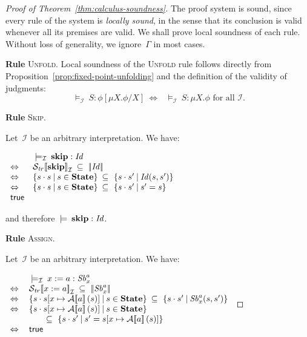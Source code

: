 \documentclass[10pt,a4paper]{amsart}
\theoremstyle{definition}
\newcommand{\setdef}[2]{\left\{ #1 \>\middle|\> #2 \right\}}
\newcommand{\denot}[1]{\left[\!\left[#1\right]\!\right]}
\newcommand{\fdenot}[1]{\left|\!\left|#1\right|\!\right|}
\newcommand{\arexdenot}[1]{\mathcal{A}\!\denot{#1}}
\newcommand{\trcdenoti}[1]{\mathcal{S}_{\mathit{tr}}\!\denot{#1}_{\mathcal{I}}}
\newcommand{\Skip}{\mbox{\bf skip}}
\newcommand{\State}{\mbox{\bf State}}
\newcommand{\judge}[2]{#1 : #2}
\newcommand{\semsequent}[2]{#1 \>\models\> #2}
\newcommand{\semsequenti}[2]{#1 \>\models_\mathcal{I}\> #2}
\begin{document}
\begin{proof}[Proof of Theorem~\ref{thm:calculus-soundness}]
  The proof system is sound, since every rule of the system is
  \emph{locally sound}, in the sense that its conclusion is valid
  whenever all its premises are valid.
  We shall prove local soundness of each rule.
  Without loss of generality, we ignore~$\Gamma$ in most cases.

  \iffalse
  \noindent\textbf{Rule} \textsc{Unfold}.
  Local soundness of the \textsc{Unfold} rule follows directly from
  Proposition~\ref{prop:fixed-point-unfolding} and the definition of
  the validity of judgments:
  \[
    \semsequenti{}{\judge{S}{\phi [\mu X. \phi / X]}}
    \>\Leftrightarrow\>\>
    \semsequenti{}{\judge{S}{\mu X. \phi}}\text{ for all }\mathcal{I}.
  \]

  \noindent\textbf{Rule} \textsc{Skip}.

  Let~$\mathcal{I}$ be an arbitrary interpretation.
  We have: %
  
  $
  \begin{array}{ll}
    & 
      \semsequenti{}{\judge{\Skip}{\mathit{Id}}} \\
    \Leftrightarrow\> & 
                        \trcdenoti{\Skip} \>\subseteq\
                        \fdenot{\mathit{Id}} \\
    \Leftrightarrow & 
                      \setdef{s \cdot s}{s \in \State} \>\subseteq\ 
                      \setdef{s \cdot s'}{\mathit{Id} (s, s')} \\
    \Leftrightarrow & 
                      \setdef{s \cdot s}{s \in \State} \>\subseteq\ 
                      \setdef{s \cdot s'}{s' = s} \\
    \mathsf{true}
  \end{array}
  $ 
  
  \noindent
  and therefore $ \semsequent{}{\judge{\Skip}{\mathit{Id}}} $.
  
  \noindent\textbf{Rule} \textsc{Assign}.
  
  Let~$\mathcal{I}$ be an arbitrary interpretation.
  We have: %

  $
  \begin{array}{ll}
    & 
      \semsequenti{}{\judge{x := a}{\mathit{Sb}^{a}_{x}}} \\
    \Leftrightarrow\> & 
                        \trcdenoti{x := a} \>\subseteq\
                        \fdenot{\mathit{Sb}^{a}_{x}} \\
    \Leftrightarrow & 
                      \setdef{s \cdot s[x \mapsto \arexdenot{a} (s)]}
                      {s \in \State} 
                      \>\subseteq\ 
                      \setdef{s \cdot s'}{\mathit{Sb}^{a}_{x} (s, s')} \\
    \Leftrightarrow & 
                      \setdef{s \cdot s[x \mapsto \arexdenot{a} (s)]}{s \in \State} \\
    & \qquad\subseteq\ 
      \setdef{s \cdot s'}{s' = s[x \mapsto \arexdenot{a} (s)]} \\
    \Leftrightarrow & 
                      \mathsf{true} 
  \end{array}
  $ 
    

\end{proof}
\end{document}

